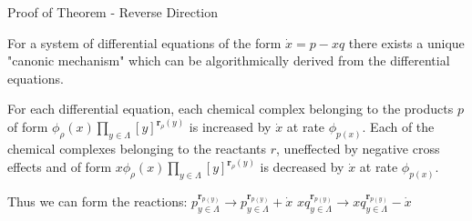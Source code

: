 \begin{frame}{Proof of Theorem - Reverse Direction}
    
	For a system of differential equations of the form \(\dot x = p - xq\) there exists a unique "canonic mechanism" which can be algorithmically derived from the differential equations.\newline
        
  	For each differential equation, each chemical complex belonging to the products \(p\) of form \(\phi_{\rho}(x) \prod_{y \in \Lambda} [y]^{\textbf{r}_{\rho}(y)}\) is increased by \(\dot x\) at rate \(\phi_{p(x)}\). Each of the chemical complexes belonging to the reactants \(r\), uneffected by negative cross effects and of form \(x\phi_{\rho}(x) \prod_{y \in \Lambda} [y]^{\textbf{r}_{\rho}(y)}\) is decreased by \(\dot x\) at rate \(\phi_{p(x)}\).\newline
        
        
        Thus we can form the reactions:\newline \newline
        \(p_{y \in \Lambda}^{\textbf{r}_{p(y)}} \to p_{y \in \Lambda}^{\textbf{r}_{p(y)}} + \dot x\) \newline \newline
        \(xq_{y \in \Lambda}^{\textbf{r}_{p(y)}} \to xq_{y \in \Lambda}^{\textbf{r}_{p(y)}} - \dot x\)
   
\end{frame}
